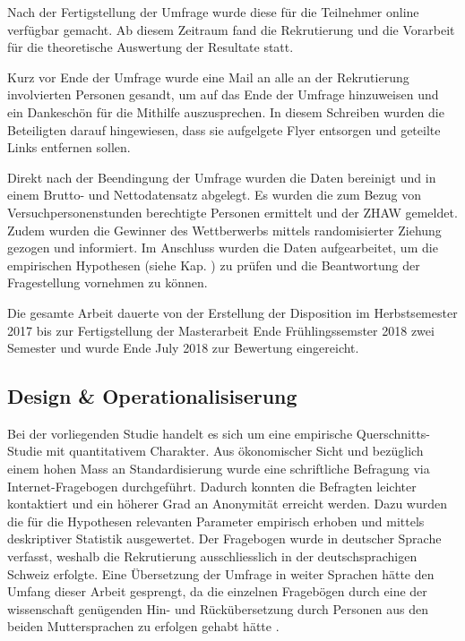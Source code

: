 Nach der Fertigstellung der Umfrage wurde diese für die Teilnehmer online verfügbar gemacht. Ab diesem Zeitraum fand die Rekrutierung und die Vorarbeit für die theoretische Auswertung der Resultate statt.

Kurz vor Ende der Umfrage wurde eine Mail an alle an der Rekrutierung involvierten Personen gesandt, um auf das Ende der Umfrage hinzuweisen und ein Dankeschön für die Mithilfe auszusprechen. In diesem Schreiben wurden die Beteiligten darauf hingewiesen, dass sie aufgelgete Flyer entsorgen und geteilte Links entfernen sollen. 

Direkt  nach der Beendingung der Umfrage wurden die Daten bereinigt und in einem Brutto- und Nettodatensatz abgelegt. Es wurden die zum Bezug von Versuchpersonenstunden berechtigte Personen ermittelt und der ZHAW gemeldet. Zudem wurden die Gewinner des Wettberwerbs mittels randomisierter Ziehung gezogen und informiert. Im Anschluss wurden die Daten aufgearbeitet, um die empirischen Hypothesen (siehe Kap. ) zu prüfen und die Beantwortung der Fragestellung vornehmen zu können.

Die gesamte Arbeit dauerte von der Erstellung der Disposition im Herbstsemester 2017 bis zur Fertigstellung der Masterarbeit Ende Frühlingssemster 2018 zwei Semester und wurde Ende July 2018 zur Bewertung eingereicht.

\subsection{Design \& Operationalisiserung} \label{sec:Design}
Bei der vorliegenden Studie handelt es sich um eine empirische Querschnitts-Studie mit quantitativem Charakter. Aus ökonomischer Sicht und bezüglich einem hohen Mass an Standardisierung \cite[S.~86ff]{sedlmeier2008} wurde eine schriftliche Befragung via Internet-Fragebogen durchgeführt. Dadurch konnten die Befragten leichter kontaktiert und ein höherer Grad an Anonymität erreicht werden. Dazu wurden die für die Hypothesen relevanten Parameter empirisch erhoben und mittels deskriptiver Statistik ausgewertet. Der Fragebogen wurde in deutscher Sprache verfasst, weshalb die Rekrutierung ausschliesslich in der deutschsprachigen Schweiz erfolgte. Eine Übersetzung der Umfrage in weiter Sprachen hätte den Umfang dieser Arbeit gesprengt, da die einzelnen Fragebögen durch eine der wissenschaft genügenden Hin- und Rückübersetzung durch Personen aus den beiden Muttersprachen zu erfolgen gehabt hätte \cite{Pfetsch2016}.


